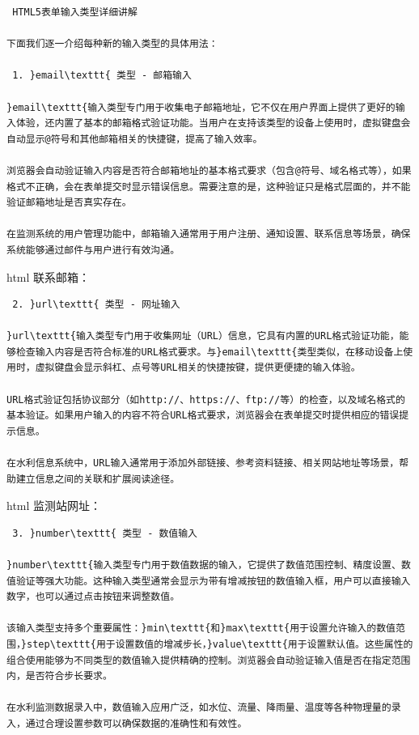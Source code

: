 \begin{lstlisting}
 HTML5表单输入类型详细讲解

下面我们逐一介绍每种新的输入类型的具体用法：

 1. }email\texttt{ 类型 - 邮箱输入

}email\texttt{输入类型专门用于收集电子邮箱地址，它不仅在用户界面上提供了更好的输入体验，还内置了基本的邮箱格式验证功能。当用户在支持该类型的设备上使用时，虚拟键盘会自动显示@符号和其他邮箱相关的快捷键，提高了输入效率。

浏览器会自动验证输入内容是否符合邮箱地址的基本格式要求（包含@符号、域名格式等），如果格式不正确，会在表单提交时显示错误信息。需要注意的是，这种验证只是格式层面的，并不能验证邮箱地址是否真实存在。

在监测系统的用户管理功能中，邮箱输入通常用于用户注册、通知设置、联系信息等场景，确保系统能够通过邮件与用户进行有效沟通。
\end{lstlisting}

html 联系邮箱：

\begin{lstlisting}
 2. }url\texttt{ 类型 - 网址输入

}url\texttt{输入类型专门用于收集网址（URL）信息，它具有内置的URL格式验证功能，能够检查输入内容是否符合标准的URL格式要求。与}email\texttt{类型类似，在移动设备上使用时，虚拟键盘会显示斜杠、点号等URL相关的快捷按键，提供更便捷的输入体验。

URL格式验证包括协议部分（如http://、https://、ftp://等）的检查，以及域名格式的基本验证。如果用户输入的内容不符合URL格式要求，浏览器会在表单提交时提供相应的错误提示信息。

在水利信息系统中，URL输入通常用于添加外部链接、参考资料链接、相关网站地址等场景，帮助建立信息之间的关联和扩展阅读途径。
\end{lstlisting}

html 监测站网址：

\begin{lstlisting}
 3. }number\texttt{ 类型 - 数值输入

}number\texttt{输入类型专门用于数值数据的输入，它提供了数值范围控制、精度设置、数值验证等强大功能。这种输入类型通常会显示为带有增减按钮的数值输入框，用户可以直接输入数字，也可以通过点击按钮来调整数值。

该输入类型支持多个重要属性：}min\texttt{和}max\texttt{用于设置允许输入的数值范围，}step\texttt{用于设置数值的增减步长，}value\texttt{用于设置默认值。这些属性的组合使用能够为不同类型的数值输入提供精确的控制。浏览器会自动验证输入值是否在指定范围内，是否符合步长要求。

在水利监测数据录入中，数值输入应用广泛，如水位、流量、降雨量、温度等各种物理量的录入，通过合理设置参数可以确保数据的准确性和有效性。
\end{lstlisting}

